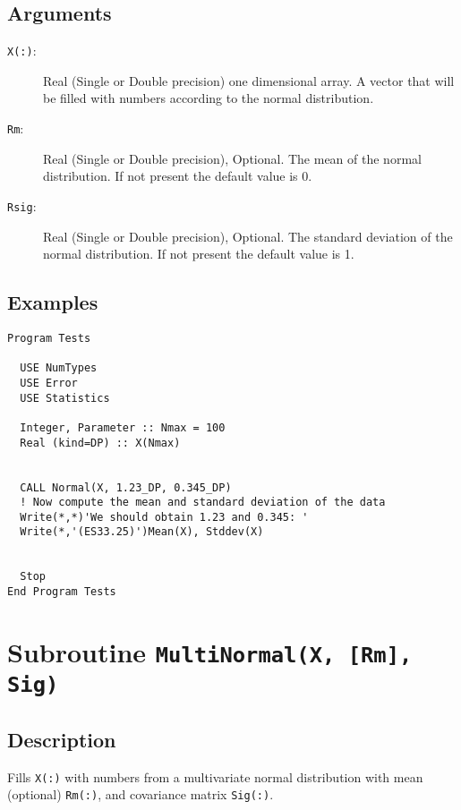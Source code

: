 \subsection{Arguments}

\begin{description}
\item[\texttt{X(:)}:] Real (Single or Double precision) one
  dimensional array. A vector that will be filled with numbers
  according to the normal distribution.
\item[\texttt{Rm}:] Real (Single or Double precision), Optional. The
  mean of the normal distribution. If not present the default value
  is 0.
\item[\texttt{Rsig}:] Real (Single or Double precision), Optional. The
  standard deviation of the normal distribution.  If not present the
  default value is 1. 
\end{description}

\subsection{Examples}

\begin{lstlisting}[emph=Normal,
                   emphstyle=\color{blue},
                   frame=trBL,
                   caption=Obtaining numbers with a normal distribution.,
                   label=normal]
Program Tests

  USE NumTypes
  USE Error
  USE Statistics

  Integer, Parameter :: Nmax = 100
  Real (kind=DP) :: X(Nmax)


  CALL Normal(X, 1.23_DP, 0.345_DP)
  ! Now compute the mean and standard deviation of the data
  Write(*,*)'We should obtain 1.23 and 0.345: '
  Write(*,'(ES33.25)')Mean(X), Stddev(X)


  Stop
End Program Tests
\end{lstlisting}

\section{Subroutine \texttt{MultiNormal(X, [Rm], Sig)}}

\subsection{Description}

Fills \texttt{X(:)} with numbers from a multivariate normal
distribution with mean (optional) \texttt{Rm(:)}, and covariance matrix
\texttt{Sig(:)}.

